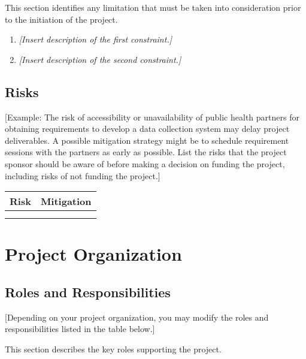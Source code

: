 \documentclass[a4paper, 11pt]{article}
\newcommand{\ra}[1]{\renewcommand{\arraystretch}{#1}}
\begin{document}
This section identifies any limitation that must be taken into
consideration prior to the initiation of the project.

\begin{enumerate}
\def\labelenumi{\arabic{enumi}.}
\item
  \emph{{[}Insert description of the first constraint.{]}}
\item
  \emph{{[}Insert description of the second constraint.{]}}
\end{enumerate}

\hypertarget{risks}{%
\subsection{Risks}\label{risks}}

{[}Example: The risk of accessibility or unavailability of public health
partners for obtaining requirements to develop a data collection system
may delay project deliverables. A possible mitigation strategy might be
to schedule requirement sessions with the partners as early as possible.
List the risks that the project sponsor should be aware of before making
a decision on funding the project, including risks of not funding the
project.{]}

\ra{1.3}
\begin{longtable}[]{@{}ll@{}}
  \toprule
  \textbf{Risk} & \textbf{Mitigation}\tabularnewline
  \midrule
  \endhead
  &\tabularnewline
  &\tabularnewline
  \bottomrule
\end{longtable}

\hypertarget{project-organization}{%
\section{Project Organization}\label{project-organization}}

\hypertarget{roles-and-responsibilities}{%
\subsection{Roles and
Responsibilities}\label{roles-and-responsibilities}}

{[}Depending on your project organization, you may modify the roles and
responsibilities listed in the table below.{]}

This section describes the key roles supporting the project.
\end{document}

